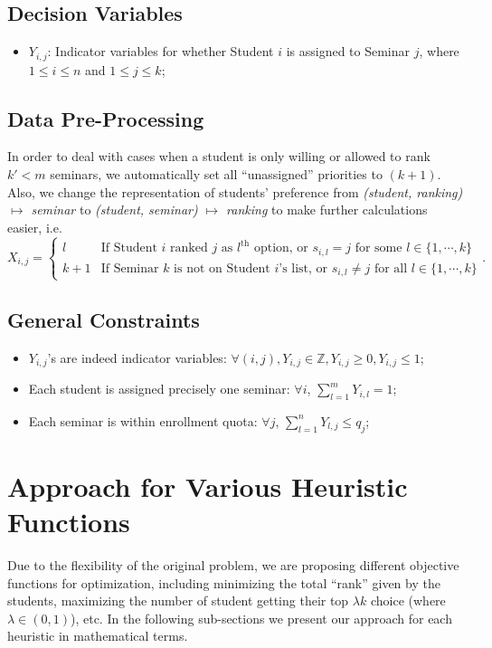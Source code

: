 \documentclass{article} %
\begin{document}
\subsection{Decision Variables}
\begin{itemize}
    \item $Y_{i,j}$: Indicator variables for whether Student $i$ is assigned to Seminar $j$, where $1\leq i \leq n$ and $1\leq j \leq k$;
\end{itemize}

\subsection{Data Pre-Processing}
    \par\qquad In order to deal with cases when a student is only willing or allowed to rank $k'<m$ seminars, we automatically set all ``unassigned'' priorities to $(k+1)$. Also, we change the representation of students' preference from \emph{(student, ranking) $\mapsto$ seminar} to \emph{(student, seminar) $\mapsto$ ranking} to make further calculations easier, i.e.
        $$X_{i,j}=\begin{cases}
                    l &\text{If Student $i$ ranked $j$ as $l^{\text{th}}$ option, or $s_{i,l}=j$ for some $l\in\{1,\cdots,k\}$}\\
                    k+1     &\text{If Seminar $k$ is not on Student $i$'s list, or $s_{i,l} \neq j$ for all $l\in\{1,\cdots,k\}$}
                  \end{cases}.$$

\subsection{General Constraints}
    \begin{itemize}
    \item $Y_{i,j}$'s are indeed indicator variables: $\forall (i,j), Y_{i,j}\in\mathbb{Z}, Y_{i,j}\geq 0, Y_{i,j}\leq 1$;
    \item Each student is assigned precisely one seminar: $\forall i$, $\sum_{l=1}^{m}{Y_{i,l}}=1$;
    \item Each seminar is within enrollment quota: $\forall j$, $\sum_{l=1}^{n}{Y_{l,j}} \leq q_j$;
\end{itemize}

%
%
\section{Approach for Various Heuristic Functions}
    \par\qquad Due to the flexibility of the original problem, we are proposing different objective functions for optimization, including minimizing the total ``rank'' given by the students, maximizing the number of student getting their top $\lambda k$ choice (where $\lambda\in(0,1)$), etc. In the following sub-sections we present our approach for each heuristic in mathematical terms.
\end{document}

